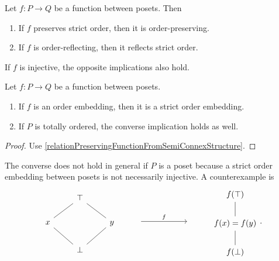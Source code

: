 \begin{lemma}
Let $f:P\to Q$ be a function between posets. Then
\begin{enumerate}
\item If $f$ preserves strict order, then it is order-preserving.
\item If $f$ is order-reflecting, then it reflects strict order.
\end{enumerate}
If $f$ is injective, the opposite implications also hold.
\end{lemma}
\begin{corollary}
Let $f: P\to Q$ be a function between posets.
\begin{enumerate}
\item If $f$ is an order embedding, then it is a strict order embedding.
\item If $P$ is totally ordered, the converse implication holds as well.
\end{enumerate}
\end{corollary}
\begin{proof}
Use \ref{relationPreservingFunctionFromSemiConnexStructure}.
\end{proof}

The converse does not hold in general if $P$ is a poset because a strict order embedding between posets is not necessarily injective. A counterexample is
\[
\begin{tikzcd}
& \top & \\
x \ar[ur, dash] & & y \ar[ul, dash] \\
& \bot \ar[ul, dash] \ar[ur, dash] &
\end{tikzcd} \qquad \begin{tikzcd} {} \arrow[rr, "f"] & {}& {}\end{tikzcd} \qquad \begin{tikzcd}
f(\top) \\ f(x) = f(y) \ar[u,dash] \\ f(\bot) \ar[u,dash]
\end{tikzcd}.
\]

